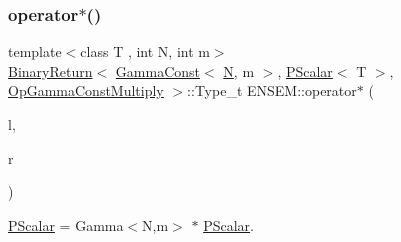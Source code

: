 \subsubsection{\texorpdfstring{operator$\ast$()}{operator*()}\hspace{0.1cm}{\footnotesize\ttfamily [2/5]}}
{\footnotesize\ttfamily template$<$class T , int N, int m$>$ \\
\mbox{\hyperlink{structENSEM_1_1BinaryReturn}{Binary\+Return}}$<$ \mbox{\hyperlink{classENSEM_1_1GammaConst}{Gamma\+Const}}$<$ \mbox{\hyperlink{adat__devel_2lib_2hadron_2operator__name__util_8cc_a7722c8ecbb62d99aee7ce68b1752f337}{N}}, m $>$, \mbox{\hyperlink{classENSEM_1_1PScalar}{P\+Scalar}}$<$ T $>$, \mbox{\hyperlink{structENSEM_1_1OpGammaConstMultiply}{Op\+Gamma\+Const\+Multiply}} $>$\+::Type\+\_\+t E\+N\+S\+E\+M\+::operator$\ast$ (\begin{DoxyParamCaption}\item[{const \mbox{\hyperlink{classENSEM_1_1GammaConst}{Gamma\+Const}}$<$ \mbox{\hyperlink{adat__devel_2lib_2hadron_2operator__name__util_8cc_a7722c8ecbb62d99aee7ce68b1752f337}{N}}, m $>$ \&}]{l,  }\item[{const \mbox{\hyperlink{classENSEM_1_1PScalar}{P\+Scalar}}$<$ T $>$ \&}]{r }\end{DoxyParamCaption})\hspace{0.3cm}{\ttfamily [inline]}}



\mbox{\hyperlink{classENSEM_1_1PScalar}{P\+Scalar}} = Gamma$<$\+N,m$>$ $\ast$ \mbox{\hyperlink{classENSEM_1_1PScalar}{P\+Scalar}}. 

\mbox{\label{group__primscalar_ga1f975f2be8a25d77d5b101c1db566a23}} 
